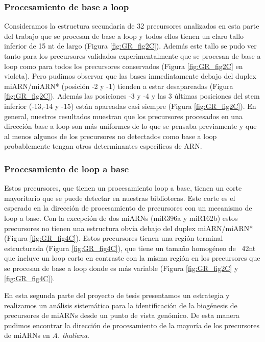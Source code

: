\subsubsection{Procesamiento de base a loop}

Consideramos la estructura secundaria de 32 precursores analizados en esta parte del trabajo que se procesan de base a loop y todos ellos tienen un claro tallo inferior de 15 nt de largo (Figura \ref{fig:GR_fig2C}).
Además este tallo se pudo ver tanto para los precursores validados experimentalmente que se procesan de base a loop como para todos los precursores conservados (Figura \ref{fig:GR_fig2C} en violeta).
Pero pudimos observar que las bases inmediatamente debajo del duplex miARN/miARN* (posición -2 y -1) tienden a estar desapareadas (Figura \ref{fig:GR_fig2C}).
Además las posiciones -3 y -4 y las 3 últimas posiciones del stem inferior (-13,-14 y -15) están apareadas casi siempre (Figura \ref{fig:GR_fig2C}).
En general, nuestros resultados muestran que los precursores procesados en una dirección base a loop son más uniformes de lo que se pensaba previamente y que al menos algunos de los precursores no detectados como base a loop probablemente tengan otros determinantes específicos de ARN.

\subsubsection{Procesamiento de loop a base}
Estos precursores, que tienen un procesamiento loop a base, tienen un corte mayoritario que se puede detectar en nuestras bibliotecas.
Este corte es el esperado en la dirección de procesamiento de precursores con un mecanismo de loop a base.
Con la excepción de dos miARNs (miR396a y miR162b) estos precursores no tienen una estructura obvia debajo del duplex miARN/miARN* (Figura \ref{fig:GR_fig4C}).
Estos precursores tienen una región terminal estructurada (Figura \ref{fig:GR_fig4C}), que tiene un tamaño homogéneo de ~42nt que incluye un loop corto en contraste con la misma región en los precursores que se procesan de base a loop donde es más variable (Figura \ref{fig:GR_fig2C} y \ref{fig:GR_fig4C}). 

En esta segunda parte del proyecto de tesis presentamos un estrategia y realizamos un análisis sistemático para la identificación de la biogénesis de precursores de miARNs desde un punto de vista genómico.
De esta manera pudimos encontrar la dirección de procesamiento de la mayoría de los precursores de miARNs en \textit{A. thaliana}.

